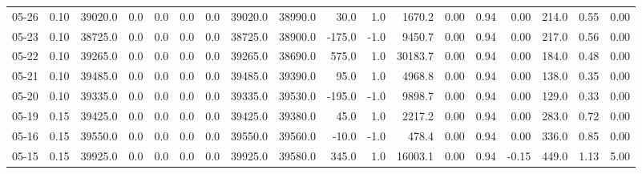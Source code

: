 \begin{threeparttable}
{\begin{tabular}{lrrrrrrrrrrrrrrrrr}
  05-26 &     0.10 & 39020.0 &               0.0 &               0.0 &                0.0 &                0.0 & 39020.0 & 38990.0 &       30.0 &                      1.0 &              1670.2 &       0.00 &      0.94 &           0.00 &            214.0 &            0.55 &                   0.00 \\
  05-23 &     0.10 & 38725.0 &               0.0 &               0.0 &                0.0 &                0.0 & 38725.0 & 38900.0 &     -175.0 &                     -1.0 &              9450.7 &       0.00 &      0.94 &           0.00 &            217.0 &            0.56 &                   0.00 \\
  05-22 &     0.10 & 39265.0 &               0.0 &               0.0 &                0.0 &                0.0 & 39265.0 & 38690.0 &      575.0 &                      1.0 &             30183.7 &       0.00 &      0.94 &           0.00 &            184.0 &            0.48 &                   0.00 \\
  05-21 &     0.10 & 39485.0 &               0.0 &               0.0 &                0.0 &                0.0 & 39485.0 & 39390.0 &       95.0 &                      1.0 &              4968.8 &       0.00 &      0.94 &           0.00 &            138.0 &            0.35 &                   0.00 \\
  05-20 &     0.10 & 39335.0 &               0.0 &               0.0 &                0.0 &                0.0 & 39335.0 & 39530.0 &     -195.0 &                     -1.0 &              9898.7 &       0.00 &      0.94 &           0.00 &            129.0 &            0.33 &                   0.00 \\
  05-19 &     0.15 & 39425.0 &               0.0 &               0.0 &                0.0 &                0.0 & 39425.0 & 39380.0 &       45.0 &                      1.0 &              2217.2 &       0.00 &      0.94 &           0.00 &            283.0 &            0.72 &                   0.00 \\
  05-16 &     0.15 & 39550.0 &               0.0 &               0.0 &                0.0 &                0.0 & 39550.0 & 39560.0 &      -10.0 &                     -1.0 &               478.4 &       0.00 &      0.94 &           0.00 &            336.0 &            0.85 &                   0.00 \\
  05-15 &     0.15 & 39925.0 &               0.0 &               0.0 &                0.0 &                0.0 & 39925.0 & 39580.0 &      345.0 &                      1.0 &             16003.1 &       0.00 &      0.94 &          -0.15 &            449.0 &            1.13 &                   5.00 \\

\end{tabular}}
\end{threeparttable}
